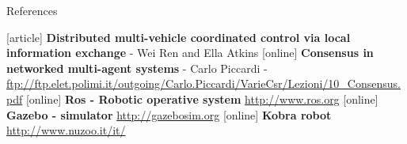 \begin{frame}{References}
\begin{thebibliography}{9}
[article]
 \textbf{Distributed multi-vehicle coordinated control via local information exchange} - Wei Ren and Ella Atkins
[online]
 \textbf{Consensus in networked multi-agent systems} - Carlo Piccardi - 
				\url{ftp://ftp.elet.polimi.it/outgoing/Carlo.Piccardi/VarieCsr/Lezioni/10_Consensus.pdf}
[online]
 \textbf{Ros - Robotic operative system}  
				\url{http://www.ros.org}
[online]
 \textbf{Gazebo - simulator}  
				\url{http://gazebosim.org}
[online]
 \textbf{Kobra robot}  
				\url{http://www.nuzoo.it/it/}				

\end{thebibliography}
\end{frame}
